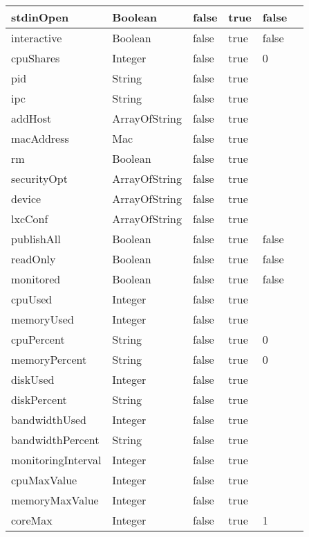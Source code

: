 \begin{itemize}
\begin{tabularx}{\textwidth}{|l|l|p{1.4cm}|p{1.3cm}|l|X|}
  \hline
  stdinOpen & Boolean & false & true & false &  \\
  \hline
  interactive & Boolean & false & true & false &  \\
  \hline
  cpuShares & Integer & false & true & 0 &  \\
  \hline
  pid & String & false & true &  &  \\
  \hline
  ipc & String & false & true &  &  \\
  \hline
  addHost & ArrayOfString & false & true &  &  \\
  \hline
  macAddress & Mac & false & true &  &  \\
  \hline
  rm & Boolean & false & true &  &  \\
  \hline
  securityOpt & ArrayOfString & false & true &  &  \\
  \hline
  device & ArrayOfString & false & true &  &  \\
  \hline
  lxcConf & ArrayOfString & false & true &  &  \\
  \hline
  publishAll & Boolean & false & true & false &  \\
  \hline
  readOnly & Boolean & false & true & false &  \\
  \hline
  monitored & Boolean & false & true & false &  \\
  \hline
  cpuUsed & Integer & false & true &  &  \\
  \hline
  memoryUsed & Integer & false & true &  &  \\
  \hline
  cpuPercent & String & false & true & 0 &  \\
  \hline
  memoryPercent & String & false & true & 0 &  \\
  \hline
  diskUsed & Integer & false & true &  &  \\
  \hline
  diskPercent & String & false & true &  &  \\
  \hline
  bandwidthUsed & Integer & false & true &  &  \\
  \hline
  bandwidthPercent & String & false & true &  &  \\
  \hline
  monitoringInterval & Integer & false & true &  &  \\
  \hline
  cpuMaxValue & Integer & false & true &  &  \\
  \hline
  memoryMaxValue & Integer & false & true &  &  \\
  \hline
  coreMax & Integer & false & true & 1 &  \\
  \hline
\end{tabularx}
\end{itemize}

